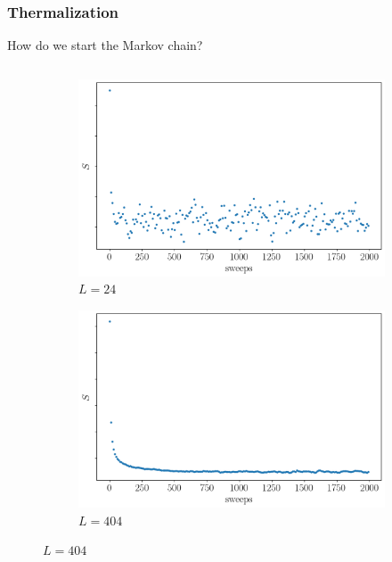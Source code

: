 \documentclass{beamer}
\begin{document}
\begin{frame}
    \frametitle{Thermalization}

    How do we start the Markov chain?
    \begin{columns}

        \begin{column}{0.5\textwidth}
            \begin{figure}[h]
              \centering
                  \begin{subfigure}[b]{0.8\textwidth}\centering
                    \includegraphics[width=\textwidth]{imgs/therm24.png}
                    \caption{$L=24$}
                  \end{subfigure}
                  \begin{subfigure}[b]{0.8\textwidth}\centering
                    \includegraphics[width=\textwidth]{imgs/therm404.png}
                    \caption{$L=404$}
                  \end{subfigure}

\end{figure}
\end{column}
\end{columns}
\end{frame}
\end{document}
